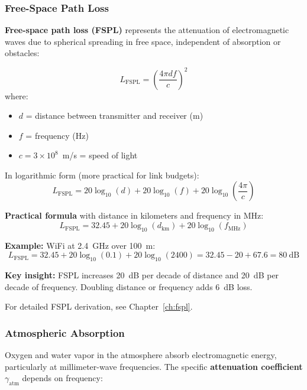 \subsubsection{Free-Space Path Loss}

\textbf{Free-space path loss (FSPL)} represents the attenuation of electromagnetic waves due to spherical spreading in free space, independent of absorption or obstacles:

\begin{equation}
\label{eq:fspl_fundamental}
L_{\text{FSPL}} = \left(\frac{4\pi d f}{c}\right)^2
\end{equation}
where:
\begin{itemize}
\item $d$ = distance between transmitter and receiver (m)
\item $f$ = frequency (Hz)
\item $c = 3 \times 10^8$~m/s = speed of light
\end{itemize}

In logarithmic form (more practical for link budgets):
\begin{equation}
\label{eq:fspl_db}
L_{\text{FSPL}} = 20\log_{10}(d) + 20\log_{10}(f) + 20\log_{10}\left(\frac{4\pi}{c}\right)
\end{equation}

\textbf{Practical formula} with distance in kilometers and frequency in MHz:
\begin{equation}
\label{eq:fspl_practical}
L_{\text{FSPL}} = 32.45 + 20\log_{10}(d_{\text{km}}) + 20\log_{10}(f_{\text{MHz}})
\end{equation}

\textbf{Example:} WiFi at 2.4~GHz over 100~m:
\begin{equation}
L_{\text{FSPL}} = 32.45 + 20\log_{10}(0.1) + 20\log_{10}(2400) = 32.45 - 20 + 67.6 = 80~\text{dB}
\end{equation}

\textbf{Key insight:} FSPL increases 20~dB per decade of distance and 20~dB per decade of frequency. Doubling distance or frequency adds 6~dB loss.

For detailed FSPL derivation, see Chapter~\ref{ch:fspl}.

\subsubsection{Atmospheric Absorption}

Oxygen and water vapor in the atmosphere absorb electromagnetic energy, particularly at millimeter-wave frequencies. The specific \textbf{attenuation coefficient} $\gamma_{\text{atm}}$ depends on frequency:

